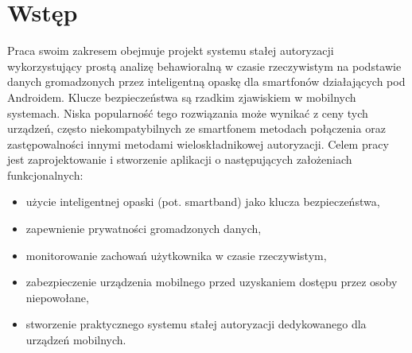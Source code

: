 \chapter{Wstęp}
\thispagestyle{chapterBeginStyle}

Praca swoim zakresem obejmuje projekt systemu stałej autoryzacji wykorzystujący prostą analizę behawioralną w czasie rzeczywistym na 
podstawie danych gromadzonych przez inteligentną opaskę dla smartfonów działających pod Androidem. Klucze bezpieczeństwa są rzadkim zjawiskiem w 
mobilnych systemach. Niska popularność tego rozwiązania może wynikać z ceny tych urządzeń, często niekompatybilnych ze smartfonem metodach połączenia oraz 
zastępowalności innymi metodami wieloskładnikowej autoryzacji.
\newline\newline
\indent Celem pracy jest zaprojektowanie i stworzenie aplikacji o następujących założeniach funkcjonalnych: 
\begin{itemize}
	\item użycie inteligentnej opaski (pot. smartband) jako klucza bezpieczeństwa,
	\item zapewnienie prywatności gromadzonych danych,
	\item monitorowanie zachowań użytkownika w czasie rzeczywistym,
	\item zabezpieczenie urządzenia mobilnego przed uzyskaniem dostępu przez osoby niepowołane,
	\item stworzenie praktycznego systemu stałej autoryzacji dedykowanego dla urządzeń mobilnych.
\end{itemize}

